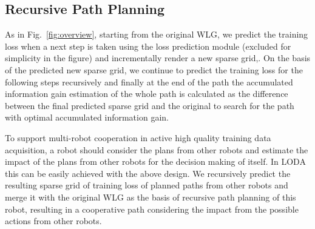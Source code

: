 
\vspace{-0.5cm}
\subsection{Recursive Path Planning}
As in Fig.~\ref{fig:overview}, starting from the original WLG, we predict the training loss when a next step is taken using the loss prediction module (excluded for simplicity in the figure) and incrementally render a new sparse grid,.
On the basis of the predicted new sparse grid, we continue to predict the training loss for the following steps recursively and finally at the end of the path the accumulated information gain estimation of the whole path is calculated as the difference between the final predicted sparse grid and the original to search for the path with optimal accumulated information gain.

To support multi-robot cooperation in active high quality training data acquisition, a robot should consider the plans from other robots and estimate the impact of the plans from other robots for the decision making of itself.
In LODA this can be easily achieved with the above design.
We recursively predict the resulting sparse grid of training loss of planned paths from other robots and merge it with the original WLG as the basis of recursive path planning of this robot, resulting in a cooperative path considering the impact from the possible actions from other robots.



